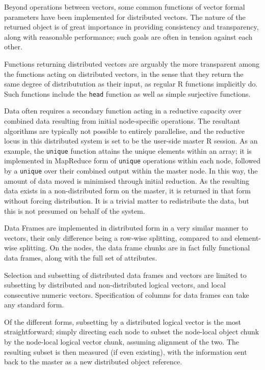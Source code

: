 \documentclass[a4paper,10pt]{article}
\begin{document}
Beyond operations between vectors, some common functions of vector formal
parameters have been implemented for distributed vectors.  
The nature of the returned object is of great importance in providing
consistency and transparency, along with reasonable performance; such goals are
often in tension against each other.

Functions returning distributed vectors are arguably the more transparent among
the functions acting on distributed vectors, in the sense that they return the
same degree of distributution as their input, as regular R functions implicitly
do.  
Such functions include the \texttt{head} function as well as simple surjective
functions.

Data often requires a secondary function acting in a reductive capacity over
combined data resulting from initial node-specific operations.  
The resultant algorithms are typically not possible to entirely parallelise,
and the reductive locus in this distributed system is set to be the user-side
master R session.  
As an example, the \texttt{unique} function attains the unique elements within
an array; it is implemented in MapReduce form of \texttt{unique} operations
within each node, followed by a \texttt{unique} over their combined output
within the master node.  
In this way, the amount of data moved is minimised through initial reduction.  
As the resulting data exists in a non-distributed form on the master, it is
returned in that form without forcing distribution.  
It is a trivial matter to redistribute the data, but this is not presumed on
behalf of the system.

Data Frames are implemented in distributed form in a very similar manner to
vectors, their only difference being a row-wise splitting, compared to and
element-wise splitting.  
On the nodes, the data frame chunks are in fact fully functional data frames,
along with the full set of attributes.

Selection and subsetting of distributed data frames and vectors are limited to
subsetting by distributed and non-distributed logical vectors, and local
consecutive numeric vectors.  
Specification of columns for data frames can take any standard form.

Of the different forms, subsetting by a distributed logical vector is the most
straightforward; simply directing each node to subset the node-local object
chunk by the node-local logical vector chunk, assuming alignment of the two.
The resulting subset is then measured (if even existing), with the information
sent back to the master as a new distributed object reference.
\end{document}
